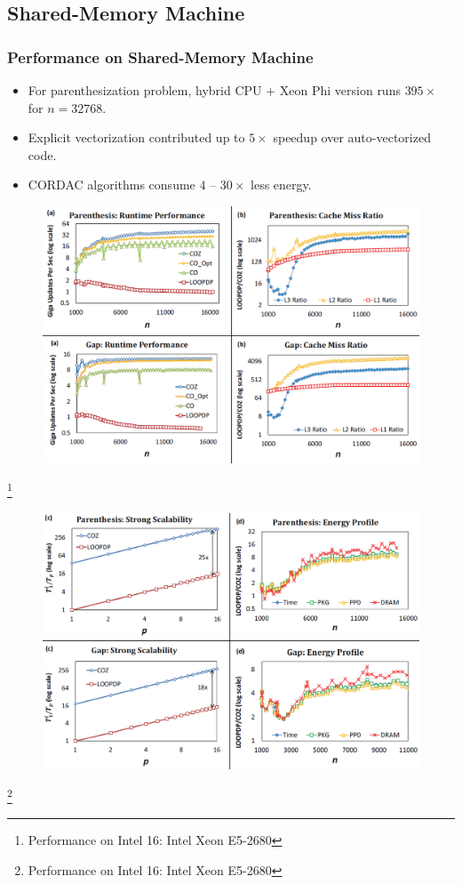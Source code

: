 \subsection{Shared-Memory Machine}
\begin{frame}
    \frametitle{Performance on Shared-Memory Machine}
    \begin{itemize}
    	\item For parenthesization problem, hybrid CPU + 
    		Xeon Phi version runs $395\times$ for $n = 32768$.
    	\item Explicit vectorization contributed up to $5\times$ speedup
    		over auto-vectorized code.
    	\item CORDAC algorithms consume $4$ -- $30\times$ less energy.
    \end{itemize}
\end{frame}

\begin{frame}
    \begin{figure}
		\includegraphics[scale=0.3]{figure/fig-shared-machine-1.png}
	\end{figure}
	\footnote{Performance on Intel 16: Intel Xeon E5-2680}
\end{frame}

\begin{frame}
    \begin{figure}
		\includegraphics[scale=0.3]{figure/fig-shared-machine-2.png}
	\end{figure}
	\footnote{Performance on Intel 16: Intel Xeon E5-2680}
\end{frame}
